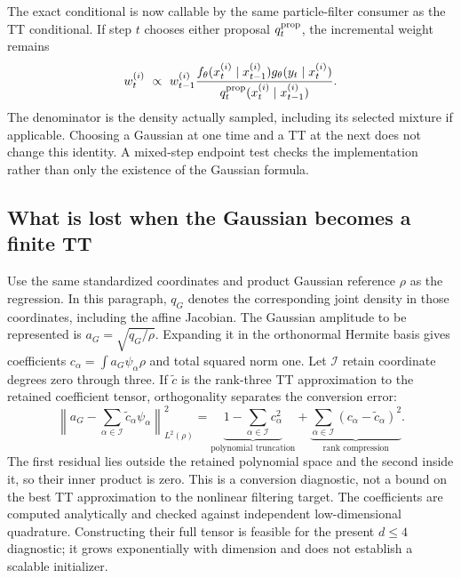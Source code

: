 \documentclass[11pt]{article}
\begin{document}
The exact conditional is now callable by the same particle-filter consumer
as the TT conditional. If step $t$ chooses either proposal $q_t^{\rm prop}$,
the incremental weight remains
\begin{equation}
 w_t^{(i)}\ \propto\ w_{t-1}^{(i)}
 \frac{f_\theta(x_t^{(i)}\mid x_{t-1}^{(i)})
       g_\theta(y_t\mid x_t^{(i)})}
      {q_t^{\rm prop}(x_t^{(i)}\mid x_{t-1}^{(i)})}.
 \label{eq:sgqf-preserve-weight}
\end{equation}
The denominator is the density actually sampled, including its selected
mixture if applicable. Choosing a Gaussian at one time and a TT at the next
does not change this identity. A mixed-step endpoint test checks the
implementation rather than only the existence of the Gaussian formula.

\subsection{What is lost when the Gaussian becomes a finite TT}

Use the same standardized coordinates and product Gaussian reference
$\rho$ as the regression. In this paragraph, $q_G$ denotes the corresponding
joint density in those coordinates, including the affine Jacobian. The
Gaussian amplitude to be represented is $a_G=\sqrt{q_G/\rho}$. Expanding it
in the orthonormal Hermite basis gives coefficients
$c_\alpha=\int a_G\psi_\alpha\rho$ and total squared norm one. Let
$\mathcal I$ retain coordinate degrees zero through three. If
$\widetilde c$ is the rank-three TT approximation to the retained coefficient
tensor, orthogonality separates the conversion error:
\begin{equation}
 \left\|a_G-\sum_{\alpha\in\mathcal I}
                 \widetilde c_\alpha\psi_\alpha\right\|_{L^2(\rho)}^2
 =\underbrace{1-\sum_{\alpha\in\mathcal I}c_\alpha^2}
                   _{\text{polynomial truncation}}
  +\underbrace{\sum_{\alpha\in\mathcal I}
                    (c_\alpha-\widetilde c_\alpha)^2}
                   _{\text{rank compression}}.
 \label{eq:sgqf-conversion-error}
\end{equation}
The first residual lies outside the retained polynomial space and the second
inside it, so their inner product is zero. This is a conversion diagnostic,
not a bound on the best TT approximation to the nonlinear filtering target.
The coefficients are computed analytically and checked against independent
low-dimensional quadrature. Constructing their full tensor is feasible for
the present $d\leq4$ diagnostic; it grows exponentially with dimension and
does not establish a scalable initializer.
\end{document}
